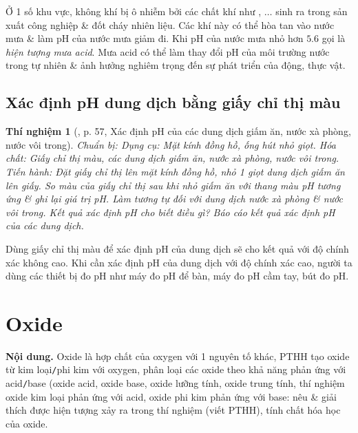 \documentclass{article}
\newtheorem{thinghiem}{Thí nghiệm}
\begin{document}
Ở 1 số khu vực, không khí bị ô nhiễm bởi các chất khí như , $\ldots$ sinh ra trong sản xuất công nghiệp \& đốt cháy nhiên liệu. Các khí này có thể hòa tan vào nước mưa \& làm pH của nước mưa giảm đi. Khi pH của nước mưa nhỏ hơn $5.6$ gọi là \textit{hiện tượng mưa acid}. Mưa acid có thể làm thay đổi pH của môi trường nước trong tự nhiên \& ảnh hưởng nghiêm trọng đến sự phát triển của động, thực vật.

\subsection{Xác định pH dung dịch bằng giấy chỉ thị màu}

\begin{thinghiem}[\cite{SGK_KHTN_8_Canh_Dieu}, p. 57, Xác định pH của các dung dịch giấm ăn, nước xà phòng, nước vôi trong]
	\emph{Chuẩn bị:} Dụng cụ: Mặt kính đồng hồ, ống hút nhỏ giọt. Hóa chất: Giấy chỉ thị màu, các dung dịch giấm ăn, nước xà phòng, nước vôi trong. \emph{Tiến hành:} Đặt giấy chỉ thị lên mặt kính đồng hồ, nhỏ 1 giọt dung dịch giấm ăn lên giấy. So màu của giấy chỉ thị sau khi nhỏ giấm ăn với thang màu pH tương ứng \& ghi lại giá trị pH. Làm tương tự đối với dung dịch nước xà phòng \& nước vôi trong. Kết quả xác định pH cho biết điều gì? Báo cáo kết quả xác định pH của các dung dịch.
\end{thinghiem}
Dùng giấy chỉ thị màu để xác định pH của dung dịch sẽ cho kết quả với độ chính xác không cao. Khi cần xác định pH của dung dịch với độ chính xác cao, người ta dùng các thiết bị đo pH như máy đo pH để bàn, máy đo pH cầm tay, bút đo pH.

\noindent{}


\section{Oxide}
\textsf{\textbf{Nội dung.} Oxide là hợp chất của oxygen với 1 nguyên tố khác, PTHH tạo oxide từ kim loại\texttt{/}phi kim với oxygen, phân loại các oxide theo khả năng phản ứng với acid\texttt{/}base (oxide acid, oxide base, oxide lưỡng tính, oxide trung tính, thí nghiệm oxide kim loại phản ứng với acid, oxide phi kim phản ứng với base: nêu \& giải thích được hiện tượng xảy ra trong thí nghiệm (viết PTHH), tính chất hóa học của oxide.}
\end{document}
